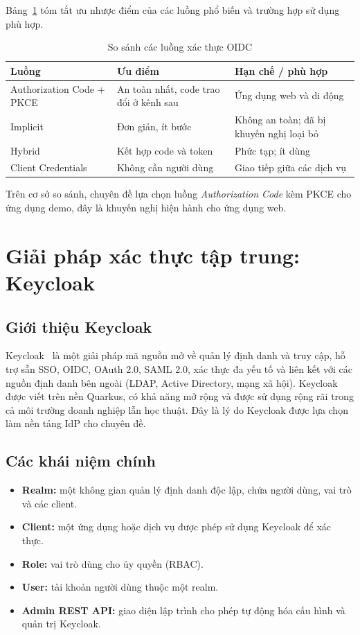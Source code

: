 Bảng~\ref{tab:oidcflows} tóm tắt ưu nhược điểm của các luồng phổ biến và
trường hợp sử dụng phù hợp.

\begin{table}[htbp]
\centering
\caption{So sánh các luồng xác thực OIDC}
\label{tab:oidcflows}
\small
\begin{tabular}{p{3cm} p{4.6cm} p{5.4cm}}
\toprule
\textbf{Luồng} & \textbf{Ưu điểm} & \textbf{Hạn chế / phù hợp}\\
\midrule
Authorization Code + PKCE & An toàn nhất, code trao đổi ở kênh sau & Ứng dụng web và di động\\
Implicit & Đơn giản, ít bước & Không an toàn; đã bị khuyến nghị loại bỏ\\
Hybrid & Kết hợp code và token & Phức tạp; ít dùng\\
Client Credentials & Không cần người dùng & Giao tiếp giữa các dịch vụ\\
\bottomrule
\end{tabular}
\end{table}

Trên cơ sở so sánh, chuyên đề lựa chọn luồng \textit{Authorization Code} kèm
PKCE cho ứng dụng demo, đây là khuyến nghị hiện hành cho ứng dụng web.

\section{Giải pháp xác thực tập trung: Keycloak}
\label{sec:keycloak}

\subsection{Giới thiệu Keycloak}

Keycloak~\cite{keycloak} là một giải pháp mã nguồn mở về quản lý định danh và
truy cập, hỗ trợ sẵn SSO, OIDC, OAuth 2.0, SAML 2.0, xác thực đa yếu tố và
liên kết với các nguồn định danh bên ngoài (LDAP, Active Directory, mạng xã
hội). Keycloak được viết trên nền Quarkus, có khả năng mở rộng và được sử
dụng rộng rãi trong cả môi trường doanh nghiệp lẫn học thuật. Đây là lý do
Keycloak được lựa chọn làm nền tảng IdP cho chuyên đề.

\subsection{Các khái niệm chính}

\begin{itemize}
  \item \textbf{Realm:} một không gian quản lý định danh độc lập, chứa người
  dùng, vai trò và các client.
  \item \textbf{Client:} một ứng dụng hoặc dịch vụ được phép sử dụng Keycloak
  để xác thực.
  \item \textbf{Role:} vai trò dùng cho ủy quyền (RBAC).
  \item \textbf{User:} tài khoản người dùng thuộc một realm.
  \item \textbf{Admin REST API:} giao diện lập trình cho phép tự động hóa cấu
  hình và quản trị Keycloak.
\end{itemize}

